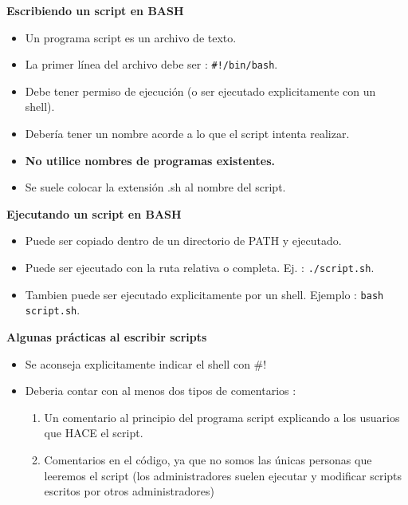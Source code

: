 \documentclass{beamer}
\begin{document}
\begin{frame}{}
\textbf{Escribiendo un script en BASH }
\begin{itemize}
\item Un programa script es un archivo de texto.
\item La primer línea del archivo debe ser : \texttt{\#!/bin/bash}.
\item Debe tener permiso de ejecución (o ser ejecutado explicitamente con un shell).
\item Debería tener un nombre acorde a lo que el script intenta realizar.
\item \textbf{No utilice nombres de programas existentes.}
\item Se suele colocar la extensión .sh al nombre del script.
\end{itemize}

\end{frame}

\begin{frame}{}
\textbf{Ejecutando un script en BASH }
\begin{itemize}
\item Puede ser copiado dentro de un directorio de PATH y ejecutado.
\item Puede ser ejecutado con la ruta relativa o completa. Ej. : \texttt{./script.sh}.
\item Tambien puede ser ejecutado explicitamente por un shell. Ejemplo : \texttt{bash script.sh}.
\end{itemize}

\end{frame}

\begin{frame}{}
\textbf{Algunas prácticas al escribir scripts }
\begin{itemize}
\item Se aconseja explicitamente indicar el shell con \#!
\item Deberia contar con al menos dos tipos de comentarios :
\begin{enumerate}
\item Un comentario al principio del programa script explicando a los usuarios que HACE el script.
\item Comentarios en el código, ya que no somos las únicas personas que leeremos el script 
(los administradores suelen ejecutar y modificar scripts escritos por otros administradores)
\end{enumerate}
\end{itemize}

\end{frame}
\end{document}
